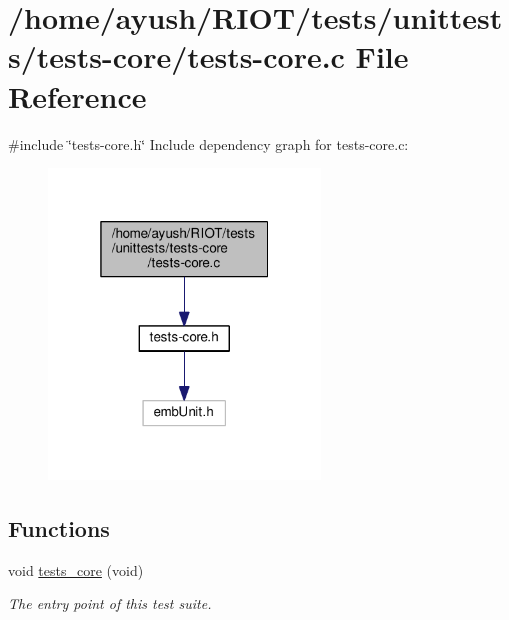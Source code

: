 \hypertarget{tests-core_8c}{}\section{/home/ayush/\+R\+I\+O\+T/tests/unittests/tests-\/core/tests-\/core.c File Reference}
\label{tests-core_8c}
{\ttfamily \#include \char`\"{}tests-\/core.\+h\char`\"{}}\newline
Include dependency graph for tests-\/core.c\+:
\nopagebreak
\begin{figure}[H]
\begin{center}
\leavevmode
\includegraphics[width=205pt]{tests-core_8c__incl}
\end{center}
\end{figure}
\subsection*{Functions}
\begin{DoxyCompactItemize}
\item 
void \hyperlink{group__unittests_gaaaf35c94f5a45e12f3556bf2be09b022}{tests\+\_\+core} (void)
\begin{DoxyCompactList}\small\item\em The entry point of this test suite. \end{DoxyCompactList}\end{DoxyCompactItemize}
